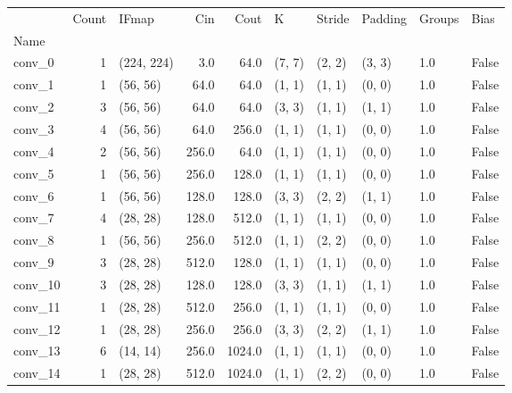 \clearpage
\begin{center}
    \begin{tabular}{lrlrrlllll}
        \toprule
        {} &  Count & IFmap &     Cin &    Cout &       K &  Stride & Padding & Groups &   Bias \\
        Name     &        &             &         &         &         &         &         &        &        \\
        \midrule
        conv\_0   & 1 &  (224, 224) &     3.0 &    64.0 &  (7, 7) &  (2, 2) &  (3, 3) &    1.0 &  False \\
        conv\_1   & 1 &    (56, 56) &    64.0 &    64.0 &  (1, 1) &  (1, 1) &  (0, 0) &    1.0 &  False \\
        conv\_2   & 3 &    (56, 56) &    64.0 &    64.0 &  (3, 3) &  (1, 1) &  (1, 1) &    1.0 &  False \\
        conv\_3   & 4 &    (56, 56) &    64.0 &   256.0 &  (1, 1) &  (1, 1) &  (0, 0) &    1.0 &  False \\
        conv\_4   & 2 &    (56, 56) &   256.0 &    64.0 &  (1, 1) &  (1, 1) &  (0, 0) &    1.0 &  False \\
        conv\_5   & 1 &    (56, 56) &   256.0 &   128.0 &  (1, 1) &  (1, 1) &  (0, 0) &    1.0 &  False \\
        conv\_6   & 1 &    (56, 56) &   128.0 &   128.0 &  (3, 3) &  (2, 2) &  (1, 1) &    1.0 &  False \\
        conv\_7   & 4 &    (28, 28) &   128.0 &   512.0 &  (1, 1) &  (1, 1) &  (0, 0) &    1.0 &  False \\
        conv\_8   & 1 &    (56, 56) &   256.0 &   512.0 &  (1, 1) &  (2, 2) &  (0, 0) &    1.0 &  False \\
        conv\_9   & 3 &    (28, 28) &   512.0 &   128.0 &  (1, 1) &  (1, 1) &  (0, 0) &    1.0 &  False \\
        conv\_10  & 3 &    (28, 28) &   128.0 &   128.0 &  (3, 3) &  (1, 1) &  (1, 1) &    1.0 &  False \\
        conv\_11  & 1 &    (28, 28) &   512.0 &   256.0 &  (1, 1) &  (1, 1) &  (0, 0) &    1.0 &  False \\
        conv\_12  & 1 &    (28, 28) &   256.0 &   256.0 &  (3, 3) &  (2, 2) &  (1, 1) &    1.0 &  False \\
        conv\_13  & 6 &    (14, 14) &   256.0 &  1024.0 &  (1, 1) &  (1, 1) &  (0, 0) &    1.0 &  False \\
        conv\_14  & 1 &    (28, 28) &   512.0 &  1024.0 &  (1, 1) &  (2, 2) &  (0, 0) &    1.0 &  False \\

\end{tabular}
\end{center}
